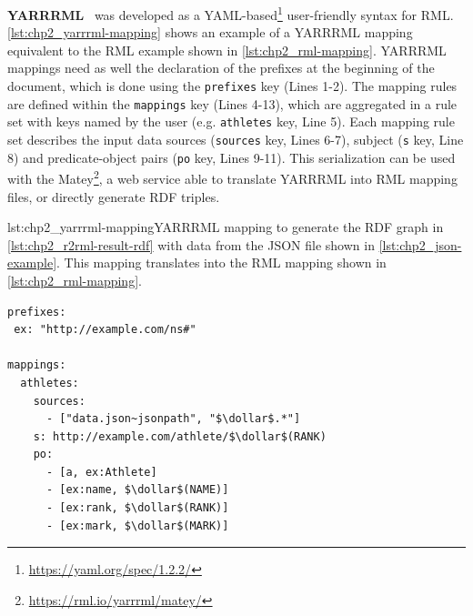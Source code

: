 \textbf{YARRRML}~\parencite{Heyvaert2018yarrrml} was developed as a YAML-based\footnote{\url{https://yaml.org/spec/1.2.2/}} user-friendly syntax for RML. 
\cref{lst:chp2_yarrrml-mapping} shows an example of a YARRRML mapping equivalent to the RML example shown in \cref{lst:chp2_rml-mapping}. 
YARRRML mappings need as well the declaration of the prefixes at the beginning of the document, which is done using the \texttt{prefixes} key (Lines 1-2). The mapping rules are defined within the \texttt{mappings} key (Lines 4-13), which are aggregated in a rule set with keys named by the user (e.g. \texttt{athletes} key, Line 5). Each mapping rule set describes the input data sources (\texttt{sources} key, Lines 6-7), subject (\texttt{s} key, Line 8) and predicate-object pairs (\texttt{po} key, Lines 9-11).
This serialization can be used with the Matey\footnote{\url{https://rml.io/yarrrml/matey/}}, a web service able to translate YARRRML into RML mapping files, or directly generate RDF triples. 

\begin{captionedlisting}{lst:chp2_yarrrml-mapping}{YARRRML mapping to generate the RDF graph in \cref{lst:chp2_r2rml-result-rdf} with data from the JSON file shown in \cref{lst:chp2_json-example}. This mapping translates into the RML mapping shown in \cref{lst:chp2_rml-mapping}.}
\centering
{\begin{lstlisting}[language=yarrrml]
prefixes:
 ex: "http://example.com/ns#"

mappings:
  athletes:
    sources:
      - ["data.json~jsonpath", "$\dollar$.*"]
    s: http://example.com/athlete/$\dollar$(RANK)
    po:
      - [a, ex:Athlete]
      - [ex:name, $\dollar$(NAME)]
      - [ex:rank, $\dollar$(RANK)]
      - [ex:mark, $\dollar$(MARK)]
\end{lstlisting}}
\end{captionedlisting}


